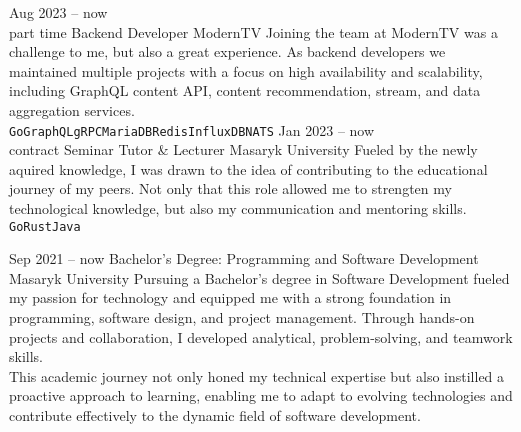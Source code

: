 \documentclass[9pt]{cv}
\begin{document}


\begin{entrylist}
	\entry
		{Aug 2023 -- now\\\footnotesize{part time}}
		{Backend Developer}
		{ModernTV}
		{Joining the team at ModernTV was a challenge to me, but also a great experience. As backend developers we maintained multiple projects with a focus on high availability and scalability, including GraphQL content API, content recommendation, stream, and data aggregation services.\\ \texttt{Go}\slashsep\texttt{GraphQL}\slashsep\texttt{gRPC}\slashsep\texttt{MariaDB}\slashsep\texttt{Redis}\slashsep\texttt{InfluxDB}\slashsep\texttt{NATS}}
	\entry
		{Jan 2023 -- now\\\footnotesize{contract}}
        {Seminar Tutor \& Lecturer}
		{Masaryk University}
		{Fueled by the newly aquired knowledge, I was drawn to the idea of contributing to the educational journey of my peers. Not only that this role allowed me to strengten my technological knowledge, but also my communication and mentoring skills.\\ \texttt{Go}\slashsep\texttt{Rust}\slashsep\texttt{Java}}
\end{entrylist}


\begin{entrylist}
	\entry
		{Sep 2021 -- now}
		{Bachelor's Degree: Programming and Software Development}
		{Masaryk University}
		{Pursuing a Bachelor's degree in Software Development fueled my passion for technology and equipped me with a strong foundation in programming, software design, and project management. Through hands-on projects and collaboration, I developed analytical, problem-solving, and teamwork skills.\\ This academic journey not only honed my technical expertise but also instilled a proactive approach to learning, enabling me to adapt to evolving technologies and contribute effectively to the dynamic field of software development.}
\end{entrylist}
\end{document}
